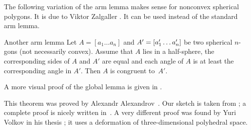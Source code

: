 The following variation of the arm lemma makes sense for nonconvex spherical polygons.
It is due to Viktor Zalgaller \cite{zalgaller}.
It can be used instead of the standard arm lemma.

\begin{thm}{Another arm lemma}
Let $A=[a_1\dots a_n]$ and $A'\z=[a'_1\z\dots a'_n]$ be two spherical $n$-gons (not necessarily convex).
Assume that $A$ lies in a half-sphere,
the corresponding sides of $A$ and $A'$ are equal
and each angle of $A$ is at least the corresponding angle in $A'$.
Then $A$ is congruent to~$A'$. 
\end{thm}

A more visual proof of the global lemma is given in \cite[II \S 1.3]{alexandrov}.

This theorem was proved by Alexandr Alexandrov~\cite{alexandrov-1941}.
Our sketch is taken from \cite{lebedeva-petrunin};
a complete proof is nicely written in~\cite{alexandrov}.
A very different proof was found by Yuri Volkov in his thesis \cite{volkov};
it uses a deformation of three-dimensional polyhedral space.
